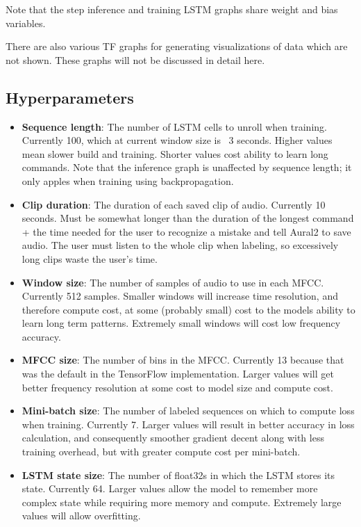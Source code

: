 \documentclass[conference]{IEEEtran}
\begin{document}
Note that the step inference and training LSTM graphs share weight and
bias variables.

There are also various TF graphs for generating visualizations of data which are not shown.
These graphs will not be discussed in detail here.

\subsection{Hyperparameters}
\begin{itemize}
\item \textbf{Sequence length}: The number of LSTM cells to unroll when training. Currently 100, which at current window size is ~3 seconds. Higher values mean slower build and training. Shorter values cost ability to learn long commands. Note that the inference graph is unaffected by sequence length; it only apples when training using backpropagation.
\item \textbf{Clip duration}: The duration of each saved clip of audio. Currently 10 seconds. Must be somewhat longer than the duration of the longest command + the time needed for the user to recognize a mistake and tell Aural2 to save audio. The user must listen to the whole clip when labeling, so excessively long clips waste the user's time.
\item \textbf{Window size}: The number of samples of audio to use in each MFCC. Currently 512 samples. Smaller windows will increase time resolution, and therefore compute cost, at some (probably small) cost to the models ability to learn long term patterns. Extremely small windows will cost low frequency accuracy.
\item \textbf{MFCC size}: The number of bins in the MFCC. Currently 13 because that was the default in the TensorFlow implementation. Larger values will get better frequency resolution at some cost to model size and compute cost.
\item \textbf{Mini-batch size}: The number of labeled sequences on which to compute loss when training. Currently 7. Larger values will result in better accuracy in loss calculation, and consequently smoother gradient decent along with less training overhead, but with greater compute cost per mini-batch.
\item \textbf{LSTM state size}: The number of float32s in which the LSTM stores its state. Currently 64. Larger values allow the model to remember more complex state while requiring more memory and compute. Extremely large values will allow overfitting.
\end{itemize}
\end{document}
